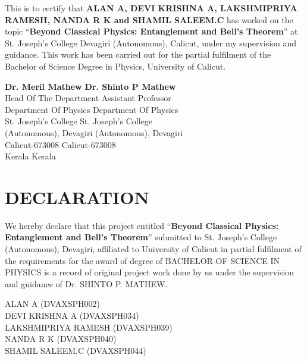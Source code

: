 \documentclass[14pt,a4paper]{extarticle}
\begin{document}
This is to certify that \textbf{ALAN A, DEVI KRISHNA A, LAKSHMIPRIYA RAMESH, NANDA R K and SHAMIL SALEEM.C} has worked on the topic “\textbf{Beyond Classical Physics: Entanglement and Bell's Theorem}” at St. Joseph’s College Devagiri (Autonomous), Calicut, under my supervision and guidance. This work has been carried out for the partial fulfilment of the Bachelor of Science Degree in Physics, University of Calicut.

\vspace{1cm}



\vfill

\begin{flushleft}
\textbf{Dr. Meril Mathew} \hfill \textbf{Dr. Shinto P Mathew}\\
Head Of The Department \hfill Assistant Professor\\
Department Of Physics \hfill Department Of Physics\\
St. Joseph's College \hfill St. Joseph's College\\
(Autonomous), Devagiri \hfill (Autonomous), Devagiri\\
Calicut-673008 \hfill Calicut-673008\\
Kerala \hfill Kerala
\end{flushleft}

\newpage
\vspace*{\fill}
\section*{\centering DECLARATION}
\justifying

We hereby declare that this project entitled “\textbf{Beyond Classical Physics: Entanglement and Bell's Theorem}” submitted to St. Joseph’s College (Autonomous), Devagiri, affiliated to University of Calicut in partial fulfilment of the requirements for the award of degree of BACHELOR OF SCIENCE IN PHYSICS is a record of original project work done by us under the supervision and guidance of Dr. SHINTO P. MATHEW.

\vspace{2cm}

\begin{flushright}
ALAN A (DVAXSPH002)\\
DEVI KRISHNA A (DVAXSPH034)\\
LAKSHMIPRIYA RAMESH (DVAXSPH039)\\
NANDA R K (DVAXSPH040)\\
SHAMIL SALEEM.C (DVAXSPH044)\\
\end{flushright}
\end{document}
